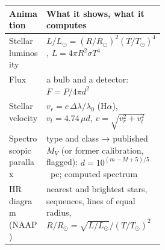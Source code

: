 \begin{center}
\small
\begin{tabularx}{\linewidth}{@{}>{\raggedright}p{0.30\linewidth}X@{}}
\toprule
Animation & What it shows, what it computes\\
\midrule
Stellar luminosity & $L/L_\odot=(R/R_\odot)^2(T/T_\odot)^4$, $L=4\pi R^2\sigma T^4$\\
Flux & a bulb and a detector: $F=P/4\pi d^2$\\
Stellar velocity & $v_r=c\,\Delta\lambda/\lambda_0$ (H$\alpha$), $v_t=4.74\,\mu d$, $v=\sqrt{v_r^2+v_t^2}$\\
Spectroscopic parallax & type and class → published $M_V$ (or former calibration, flagged); $d=10^{(m-M+5)/5}$~pc; computed spectrum\\
HR diagram (NAAP) & nearest and brightest stars, sequences, lines of equal radius, $R/R_\odot=\sqrt{L/L_\odot}/(T/T_\odot)^2$\\
\bottomrule
\end{tabularx}
\end{center}

